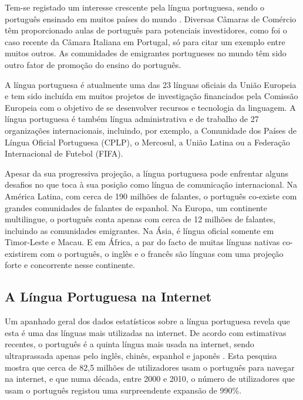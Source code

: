\begin{multicols}{2}
Tem-se registado um interesse crescente pela língua portuguesa, sendo o português ensinado em muitos países do mundo \cite{camoes2}. 
Diversas Câmaras de Comércio têm proporcionado aulas de português para potenciais investidores, 
como foi o caso recente da Câmara Italiana em Portugal, só para citar um exemplo entre muitos outros. As comunidades de emigrantes portugueses no mundo têm sido 
outro fator de promoção do ensino do português.


A língua portuguesa é atualmente uma das 23 línguas oficiais da União Europeia e tem sido incluída em muitos projetos de investigação financiados pela Comissão Europeia com o objetivo de se desenvolver recursos e tecnologia da linguagem. 
A língua portuguesa é também língua administrativa e de trabalho de 27 organizações internacionais, incluindo, por exemplo, a Comunidade dos Países de Língua Oficial Portuguesa (CPLP), o Mercosul, a União Latina ou a Federação Internacional de Futebol (FIFA). 


Apesar da sua progressiva projeção, a língua portuguesa pode enfrentar alguns desafios no que toca à sua posição como língua de comunicação internacional. 
Na América Latina, com cerca de 190 milhões de falantes, o português co-existe com grandes comunidades de falantes de espanhol. Na Europa, 
um continente multilingue, o português conta apenas com cerca de 12 milhões de falantes, incluindo as comunidades e\-mi\-gran\-tes. 
Na Ásia, é língua oficial somente em Timor-Leste e Macau. E em África, a par do facto de muitas línguas nativas co-existirem com o português, 
o inglês e o francês são línguas com uma  projeção forte e concorrente nesse continente.



\subsection{A Língua Portuguesa na Internet}

 Um apanhado geral dos dados estatísticos sobre a língua portuguesa revela que esta é uma das línguas mais utilizadas na internet. De acordo com estimativas recentes, 
o português é a quinta língua mais usada na internet, sendo ultraprassada apenas pelo inglês, chinês, espanhol e japonês \cite{twtrcon}. 
Esta pesquisa mostra que cerca de 82,5 milhões de utilizadores usam o português para navegar na internet, e que numa década, entre 2000 e 2010, 
o número de utilizadores que usam o português registou uma surpreendente expansão de 990\%.


\end{multicols}
